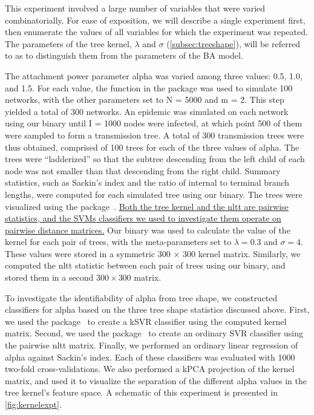 This experiment involved a large number of variables that were varied
combinatorially. For ease of exposition, we will describe a single experiment
first, then enumerate the values of all variables for which the experiment was
repeated. The parameters of the tree kernel, $\lambda$ and $\sigma$
(\cref{subsec:treeshape}), will be referred to as  to
distinguish them from the parameters of the \gls{BA} model. 

The attachment power parameter \gls{alpha} was varied among three values: 0.5,
1.0, and 1.5. For each value, the  function in the
 package was used to simulate 100 networks, with the other
parameters set to \gls{N} = 5000 and \gls{m} = 2. This step yielded a total of
300 networks. An epidemic was simulated on each network using our
 binary until \gls{I} = 1000 nodes were infected, at which
point 500 of them were sampled to form a transmission tree. A total of 300
transmission trees were thus obtained, comprised of 100 trees for each of the
three values of \gls{alpha}. The trees were ``ladderized'' so that the subtree
descending from the left child of each node was not smaller than that
descending from the right child. Summary statistics, such as Sackin's index and
the ratio of internal to terminal branch lengths, were computed for each
simulated tree using our  binary. The trees were visualized
using the  package~\autocite{paradis2004ape}. {\color{blue}\uline{
Both the tree kernel and the \gls{nltt} are pairwise statistics, and the
\glspl{SVM} classifiers we used to investigate them operate on pairwise
distance matrices.}} Our  binary was used to calculate the
value of the kernel for each pair of trees, with the meta-parameters set to
$\lambda = 0.3$ and $\sigma = 4$. These values were stored in a symmetric 300
$\times$ 300 kernel matrix.  Similarly, we computed the \gls{nltt} statistic
between each pair of trees using our  binary, and stored
them in a second $300 \times 300$ matrix.

To investigate the identifiability of \gls{alpha} from tree shape, we
constructed classifiers for \gls{alpha} based on the three tree shape
statistics discussed above. First, we used the 
package~\autocite{zeileis2004kernlab} to create a \gls{kSVR} classifier using
the computed kernel matrix. Second, we used the 
package~\autocite{meyer2015e1071} to create an ordinary \gls{SVR} classifier
using the pairwise \gls{nltt} matrix. Finally, we performed an ordinary linear
regression of \gls{alpha} against Sackin's index. Each of these classifiers was
evaluated with 1000 two-fold cross-validations. We also performed a \gls{kPCA}
projection of the kernel matrix, and used it to visualize the separation of the
different \gls{alpha} values in the tree kernel's feature space. A schematic of
this experiment is presented in \cref{fig:kernelexpt}.

